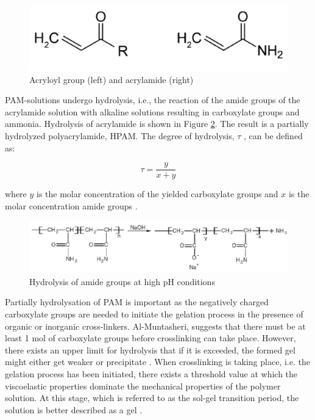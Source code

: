 \begin{figure}
    \centering
    \includegraphics[width=\textwidth]{img/fig/acrylamide.png}
    \caption{Acryloyl group (left) and acrylamide (right)}
    \label{fig:acrylamide} %
\end{figure}

PAM-solutions undergo hydrolysis, i.e., the reaction of the amide groups of the acrylamide solution with alkaline solutions resulting in carboxylate groups and ammonia. Hydrolysis of acrylamide is shown in Figure \ref{fig:amideHydrol}. The result is a partially hydrolyzed polyacrylamide, HPAM. The degree of hydrolysis, $\tau$ , can be defined as:

\begin{equation}
    \tau = \frac{y}{x+y}
\end{equation}							

where $y$ is the molar concentration of the yielded carboxylate groups and $x$ is the molar concentration amide groups \citep{Al-Muntasheri2012}.

\begin{figure}
    \centering
    \includegraphics[width=\textwidth]{img/fig/amideHydrol.png}
    \caption{Hydrolysis of amide groups at high pH conditions \citep{Al-muntasheri2008}}
    \label{fig:amideHydrol} %
\end{figure}

Partially hydrolysation of PAM is important as the negatively charged carboxylate groups are needed to initiate the gelation process in the presence of organic or inorganic cross-linkers. Al-Muntasheri, suggests that there must be at least 1 mol of carboxylate groups before crosslinking can take place. However, there exists an upper limit for hydrolysis that if it is exceeded, the formed gel might either get weaker or precipitate \citep{Al-Muntasheri2007}. When crosslinking is taking place, i.e. the gelation process has been initiated, there exists a threshold value at which the viscoelastic properties dominate the mechanical properties of the polymer solution. At this stage, which is referred to as the sol-gel transition period, the solution is better described as a gel \citep{Albonico1994}.

